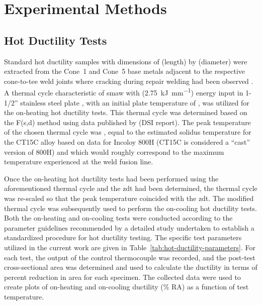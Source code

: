 \chapter{Experimental Methods} \label{ch:experimental-methods}

\section{Hot Ductility Tests}
Standard hot ductility samples with dimensions of  (length) by  (diameter) were extracted from the Cone~1 and Cone~5 base metals adjacent to the respective cone-to-tee weld joints where cracking during repair welding had been observed \cite{hoffman_weld_1998}.  A thermal cycle characteristic of \gls{smaw} with  (\SI[round-mode=places,round-precision=2]{2.75}{\kilo\joule\per\milli\meter}) energy input in 1-1/2” stainless steel plate \cite{nippes_heat-affected_1955}, with an initial plate temperature of , was utilized for the on-heating hot ductility tests.  This thermal cycle was determined based on the F(s,d) method \cite{nippes_cooling_1949} using data published by (DSI report). The peak temperature of the chosen thermal cycle was , equal to the estimated solidus temperature for the CT15C alloy based on data for Incoloy 800H (CT15C is considered a ``cast'' version of 800H) and which would roughly correspond to the maximum temperature experienced at the weld fusion line.

Once the on-heating hot ductility tests had been performed using the aforementioned thermal cycle and the \gls{zdt} had been determined, the thermal cycle was re-scaled so that the peak temperature coincided with the \gls{zdt}. The modified thermal cycle was subsequently used to perform the on-cooling hot ductility tests.  Both the on-heating and on-cooling tests were conducted according to the parameter guidelines recommended by a detailed study \cite{lundin_standardization_1990_experiment} undertaken to establish a standardized procedure for hot ductility testing.  The specific test parameters utilized in the current work are given in Table~\ref{tab:hot-ductility-parameters}.  For each test, the output of the control thermocouple was recorded, and the post-test cross-sectional area was determined and used to calculate the ductility in terms of percent reduction in area for each specimen.  The collected data were used to create plots of on-heating and on-cooling ductility (\% RA) as a function of test temperature.

